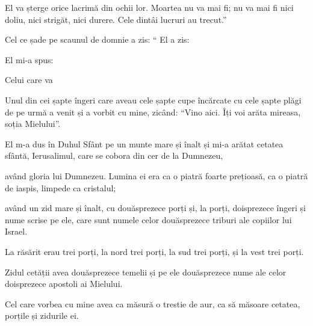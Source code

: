 {El va șterge orice lacrimă din ochii lor. Moartea nu va mai fi; nu va mai fi nici doliu, nici strigăt, nici durere. Cele dintâi lucruri au trecut.”


\par }{\PP {}Cel ce șade pe scaunul de domnie a zis: “{} El a zis:
{}

El mi-a spus:
{}

Celui care va
{}



\par }{\PP {}Unul din cei șapte îngeri care aveau cele șapte cupe încărcate cu cele șapte plăgi de pe urmă a venit și a vorbit cu mine, zicând: “Vino aici. Îți voi arăta mireasa, soția Mielului”.

El m-a dus în Duhul Sfânt pe un munte mare și înalt și mi-a arătat cetatea sfântă, Ierusalimul, care se cobora din cer de la Dumnezeu,

având gloria lui Dumnezeu. Lumina ei era ca o piatră foarte prețioasă, ca o piatră de iaspis, limpede ca cristalul;

având un zid mare și înalt, cu douăsprezece porți și, la porți, doisprezece îngeri și nume scrise pe ele, care sunt numele celor douăsprezece triburi ale copiilor lui Israel.

La răsărit erau trei porți, la nord trei porți, la sud trei porți, și la vest trei porți.

Zidul cetății avea douăsprezece temelii și pe ele douăsprezece nume ale celor doisprezece apostoli ai Mielului.


\par }{\PP {}Cel care vorbea cu mine avea ca măsură o trestie de aur, ca să măsoare cetatea, porțile și zidurile ei.

}
